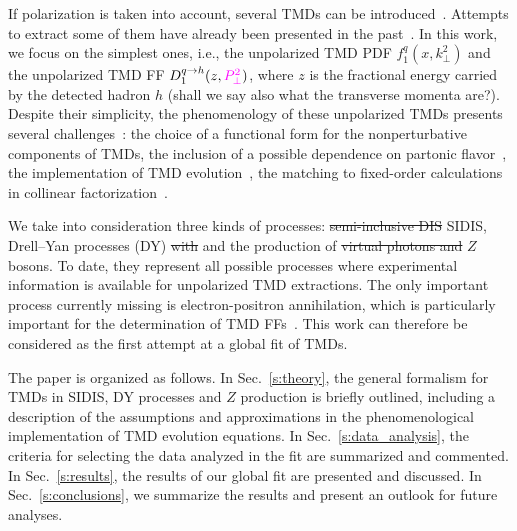 \documentclass[aps,preprintnumbers,showpacs,nofootinbib,superscriptaddress,floatfix]{revtex4}
\newcommand{\AS}[1]{{\textcolor[rgb]{1,0,1}{#1}}}
\newcommand{\T}{\perp}
\begin{document}

If polarization is taken into account, several TMDs can be
introduced~\cite{Mulders:1995dh,Boer:1997nt,%
Bacchetta:2000jk,%
Mulders:2000sh,%
Boer:2016xqr%
}. Attempts to extract some of them have already been presented in the past~\cite{Bacchetta:2011gx,Anselmino:2012aa,Echevarria:2014xaa,Anselmino:2016uie,%
Lu:2009ip,Barone:2015ksa,%
Lefky:2014eia,%
Anselmino:2013vqa,Kang:2015msa%
}.  In
this work, we focus on the simplest ones, i.e., the unpolarized TMD
PDF $f_1^q(x,k_{\T}^2)$ and the unpolarized TMD
FF $D_1^{q \to h}(z,\AS{P_{\perp}^2})$, where $z$ is
  the fractional energy carried by the detected hadron $h$ \AS{(shall we say also what the transverse momenta are?)}. Despite their
  simplicity, the phenomenology of these unpolarized TMDs \AS{presents} several
  challenges~\cite{Signori:2016lvd}: the choice of a functional form 
  for the nonperturbative components of TMDs, 
  the inclusion of a possible dependence on partonic
  flavor~\cite{Signori:2013mda}, the implementation of TMD
  evolution~\cite{Bacchetta:2015ora,Rogers:2015sqa}, the matching to
  fixed-order calculations in collinear
  factorization~\cite{Collins:2016hqq}. 

We take into consideration three kinds of processes: \AS{\sout{semi-inclusive DIS}} \AS{SIDIS}, 
Drell--Yan processes (DY) \AS{\sout{with}} \AS{and} the production of \AS{\sout{virtual photons and}} $Z$
bosons. To date, they represent 
all possible processes
  where experimental information is available for unpolarized TMD
  extractions. 
The only important
process currently missing is electron-positron annihilation, which is
particularly important for the determination of TMD
FFs~\cite{Bacchetta:2015ora}. This work can therefore be considered as the
first attempt at a global fit of TMDs.  

The paper is organized as follows. In Sec.~\ref{s:theory}, the general
formalism for TMDs in SIDIS, \AS{DY processes and $Z$ production} is briefly outlined, including a
description of the assumptions and approximations in the phenomenological
implementation of TMD evolution equations. In Sec.~\ref{s:data_analysis}, the criteria
for selecting the data analyzed in the fit are summarized and commented. In
Sec.~\ref{s:results}, the results of our global fit are presented and
discussed. In Sec.~\ref{s:conclusions}, we summarize the results and present an outlook for future analyses. 
   
\end{document}
